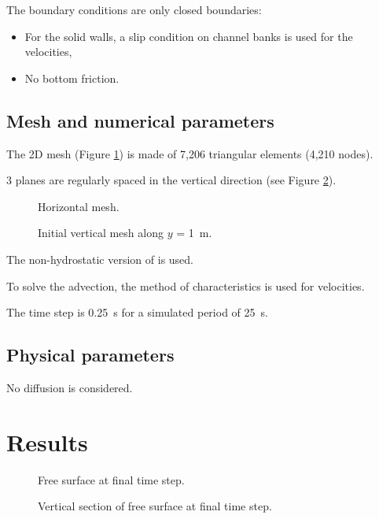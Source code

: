 The boundary conditions are only closed boundaries:
\begin{itemize}
\item For the solid walls, a slip condition on channel banks is used for the
velocities,
\item No bottom friction.
\end{itemize}

\subsection{Mesh and numerical parameters}

The 2D mesh (Figure \ref{t3d:uneven:fig:meshH})
is made of 7,206 triangular elements (4,210 nodes).

3 planes are regularly spaced in the vertical direction
(see Figure \ref{t3d:uneven:fig:meshV}).

\begin{figure}[!htbp]
 \centering
 \caption{Horizontal mesh.}
 \label{t3d:uneven:fig:meshH}
\end{figure}

\begin{figure}[!htbp]
 \centering
 \caption{Initial vertical mesh along $y$ = 1~m.}
 \label{t3d:uneven:fig:meshV}
\end{figure}

The non-hydrostatic version of  is used.

To solve the advection, the method of characteristics is used for velocities.

The time step is 0.25~s for a simulated period of 25~s.

\subsection{Physical parameters}

No diffusion is considered.

\section{Results}

\begin{figure}[H]
  \centering
  \caption{Free surface at final time step.}
  \label{t3d:uneven:FreeSurf}
\end{figure}

\begin{figure}[H]
  \centering
  \caption{Vertical section of free surface at final time step.}
  \label{t3d:uneven:FreeSurfV}
\end{figure}

